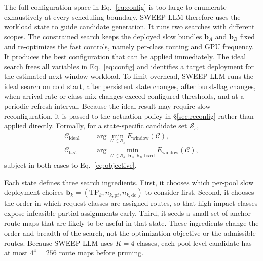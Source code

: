 The full configuration space in Eq.~\ref{eq:config} is too large to enumerate exhaustively at every scheduling boundary.
SWEEP-LLM therefore uses the workload state to guide candidate generation.
It runs two searches with different scopes.
The constrained search keeps the deployed slow bundles $\mathbf{b}_A$ and $\mathbf{b}_B$ fixed and re-optimizes the fast controls, namely per-class routing and GPU frequency.
It produces the best configuration that can be applied immediately.
The ideal search frees all variables in Eq.~\ref{eq:config} and identifies a target deployment for the estimated next-window workload.
To limit overhead, SWEEP-LLM runs the ideal search on cold start, after persistent state changes, after burst-flag changes, when arrival-rate or class-mix changes exceed configured thresholds, and at a periodic refresh interval.
Because the ideal result may require slow reconfiguration, it is passed to the actuation policy in \S\ref{sec:reconfig} rather than applied directly.
Formally, for a state-specific candidate set $\mathcal{S}_s$,
\begin{align}
\mathcal{C}_{\mathrm{ideal}}
&=
\arg\min_{\mathcal{C}\in\mathcal{S}_s}
E_{\mathrm{window}}(\mathcal{C}),
\label{eq:ideal_search}
\\
\mathcal{C}_{\mathrm{fast}}
&=
\arg\min_{\mathcal{C}\in\mathcal{S}_s:\,\mathbf{b}_A,\mathbf{b}_B\text{ fixed}}
E_{\mathrm{window}}(\mathcal{C}),
\label{eq:constrained_search}
\end{align}
subject in both cases to Eq.~\ref{eq:objective}.

Each state defines three search ingredients.
First, it chooses which per-pool slow deployment choices $\mathbf{b}_k=(\mathrm{TP}_k,n_{k,\mathrm{pf}},n_{k,\mathrm{dc}})$ to consider first.
Second, it chooses the order in which request classes are assigned routes, so that high-impact classes expose infeasible partial assignments early.
Third, it seeds a small set of anchor route maps that are likely to be useful in that state.
These ingredients change the order and breadth of the search, not the optimization objective or the admissible routes.
Because SWEEP-LLM uses $K=4$ classes, each pool-level candidate has at most $4^4=256$ route maps before pruning.

